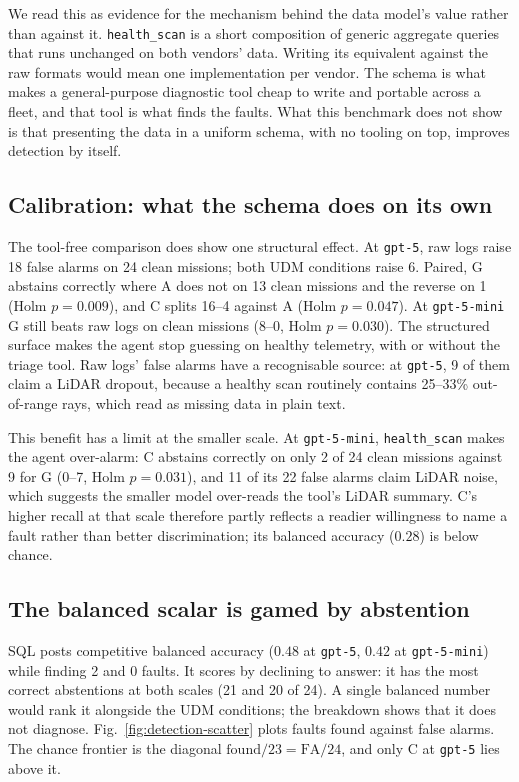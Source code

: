 \documentclass[conference]{IEEEtran}
\newcommand{\condA}{A}
\newcommand{\condC}{C}
\newcommand{\condG}{G}
\newcommand{\hs}{\texttt{health\_scan}}
\begin{document}
We read this as evidence for the mechanism behind the data model's value rather
than against it. \hs{} is a short composition of generic aggregate queries that
runs unchanged on both vendors' data. Writing its equivalent against the raw
formats would mean one implementation per vendor. The schema is what makes a
general-purpose diagnostic tool cheap to write and portable across a fleet, and
that tool is what finds the faults. What this benchmark does not show is that
presenting the data in a uniform schema, with no tooling on top, improves
detection by itself.

\subsection{Calibration: what the schema does on its own}
The tool-free comparison does show one structural effect. At \texttt{gpt-5}, raw
logs raise 18 false alarms on 24 clean missions; both UDM conditions raise 6. Paired,
\condG{} abstains correctly where \condA{} does not on 13 clean missions and the
reverse on 1 (Holm $p=0.009$), and \condC{} splits 16--4 against \condA{} (Holm
$p=0.047$). At \texttt{gpt-5-mini} \condG{} still beats raw logs on clean missions
(8--0, Holm $p=0.030$). The structured surface makes the agent stop guessing on
healthy telemetry, with or without the triage tool. Raw logs' false alarms have a
recognisable source: at \texttt{gpt-5}, 9 of them claim a LiDAR dropout, because a
healthy scan routinely contains 25--33\% out-of-range rays, which read as missing
data in plain text.

This benefit has a limit at the smaller scale. At \texttt{gpt-5-mini}, \hs{} makes
the agent over-alarm: \condC{} abstains correctly on only 2 of 24 clean missions
against 9 for \condG{} (0--7, Holm $p=0.031$), and 11 of its 22 false alarms claim
LiDAR noise, which suggests the smaller model over-reads the tool's LiDAR summary.
\condC{}'s higher recall at that scale therefore partly reflects a readier
willingness to name a fault rather than better discrimination; its balanced
accuracy ($0.28$) is below chance.

\subsection{The balanced scalar is gamed by abstention}
SQL posts competitive balanced accuracy ($0.48$ at \texttt{gpt-5}, $0.42$ at
\texttt{gpt-5-mini}) while finding 2 and 0 faults. It scores by declining to answer:
it has the most correct abstentions at both scales (21 and 20 of 24). A single
balanced number would rank it alongside the UDM conditions; the breakdown shows
that it does not diagnose. Fig.~\ref{fig:detection-scatter} plots faults found
against false alarms. The chance frontier is the diagonal $\text{found}/23 =
\text{FA}/24$, and only \condC{} at \texttt{gpt-5} lies above it.
\end{document}
